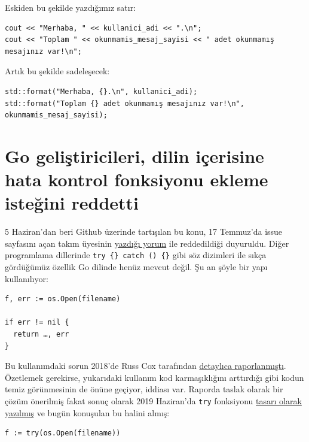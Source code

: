 \documentclass[11pt]{article}
\begin{document}
Eskiden bu şekilde yazdığımız satır:

\begin{verbatim}
cout << "Merhaba, " << kullanici_adi << ".\n";
cout << "Toplam " << okunmamis_mesaj_sayisi << " adet okunmamış mesajınız var!\n";
\end{verbatim}

Artık bu şekilde sadeleşecek:
\begin{verbatim}
std::format("Merhaba, {}.\n", kullanici_adi);
std::format("Toplam {} adet okunmamış mesajınız var!\n", okunmamis_mesaj_sayisi);
\end{verbatim}
\section{Go geliştiricileri, dilin içerisine hata kontrol fonksiyonu ekleme isteğini reddetti}
\label{sec:orgdd9f5e1}
5 Haziran'dan beri Github üzerinde tartışılan bu konu, 17 Temmuz'da issue
sayfasını açan takım üyesinin \href{https://github.com/golang/go/issues/32437\#issuecomment-512035919}{yazdığı yorum} ile reddedildiği duyuruldu. Diğer
programlama dillerinde \texttt{try \{\} catch () \{\}} gibi söz dizimleri ile sıkça
gördüğümüz özellik Go dilinde henüz mevcut değil. Şu an şöyle bir yapı
kullanılıyor:

\begin{verbatim}
f, err := os.Open(filename)

if err != nil {
  return …, err
}
\end{verbatim}

Bu kullanımdaki sorun 2018'de Russ Cox tarafından \href{https://go.googlesource.com/proposal/+/master/design/go2draft-error-handling-overview.md}{detaylıca raporlanmıştı}.
Özetlemek gerekirse, yukarıdaki kullanım kod karmaşıklığını arttırdığı gibi
kodun temiz görünmesinin de önüne geçiyor, iddiası var. Raporda taslak olarak
bir çözüm önerilmiş fakat sonuç olarak 2019 Haziran'da \texttt{try} fonksiyonu \href{https://github.com/golang/proposal/blob/master/design/32437-try-builtin.md}{tasarı
olarak yazılmış} ve bugün konuşulan bu halini almış:

\begin{verbatim}
f := try(os.Open(filename))
\end{verbatim}
\end{document}

